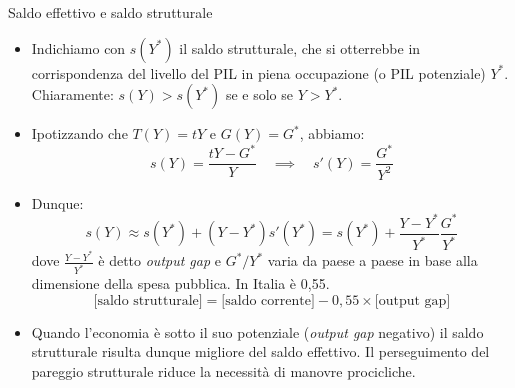 \documentclass[aspectratio=64,11pt]{beamer}
\begin{document}
\begin{frame}{Saldo effettivo e saldo strutturale}

  \begin{itemize}
  \item Indichiamo con $s(Y^*)$ il \alert{saldo strutturale}, che si otterrebbe in
    corrispondenza del livello del PIL in piena occupazione (o PIL potenziale)
    $Y^*$. Chiaramente: $s(Y)>s(Y^*)$ se e solo se $Y>Y^*$.
  \item Ipotizzando che $T(Y)=tY$ e $G(Y)=G^*$, abbiamo:
    \begin{equation*}
      s(Y)=\frac{tY - G^*}{Y} \quad\implies\quad s'(Y)=\frac{G^*}{Y^2}
    \end{equation*}
  \item Dunque:
    \begin{equation*}
      s(Y)\approx s(Y^*)+(Y-Y^*)s'(Y^*)=s(Y^*)+\frac{Y-Y^*}{Y^*}\frac{G^*}{Y^*}
    \end{equation*}
    dove $\frac{Y-Y^*}{Y^*}$ è detto \emph{output gap} e $G^*/Y^*$ varia da paese a
    paese in base alla dimensione della spesa pubblica. In Italia è 0,55.
    \begin{equation*}
      \text{[saldo strutturale]} =
         \text{[saldo corrente]} -  0,\!55 \times\text{[output gap]}
    \end{equation*}
  \item Quando l'economia è sotto il suo potenziale (\emph{output gap}
    negativo) il saldo strutturale risulta dunque migliore del saldo
    effettivo. Il perseguimento del pareggio strutturale riduce la necessità
    di manovre procicliche.
  \end{itemize}
\end{frame}
\end{document}
